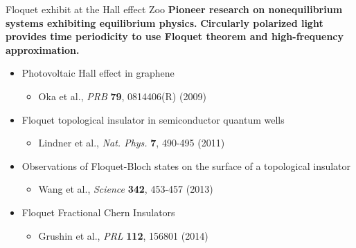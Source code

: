 \documentclass[xcolor=dvipsnames,10pt,aspectratio=169]{beamer}
\begin{document}
  \begin{frame}{Floquet exhibit at the Hall effect Zoo}
    \textbf{Pioneer research on nonequilibrium systems exhibiting equilibrium physics.}
    \newline
    \textbf{Circularly polarized light provides time periodicity to use Floquet theorem and high-frequency approximation.}
    \newline
    \begin{itemize}
      \item Photovoltaic Hall effect in graphene
      \begin{itemize}
        \item \small Oka et al., \textit{PRB} \textbf{79}, 0814406(R) (2009)
      \end{itemize}
      \item Floquet topological insulator in semiconductor quantum wells
      \begin{itemize}
        \item \small Lindner et al., \textit{Nat. Phys.} \textbf{7}, 490-495 (2011)
      \end{itemize}
      \item Observations of Floquet-Bloch states on the surface of a topological insulator
      \begin{itemize}
        \item \small Wang et al., \textit{Science} \textbf{342}, 453-457 (2013)
      \end{itemize}
      \item Floquet Fractional Chern Insulators
      \begin{itemize}
        \item \small Grushin et al., \textit{PRL} \textbf{112}, 156801 (2014)
      \end{itemize}
    \end{itemize}

  \end{frame}
\end{document}
